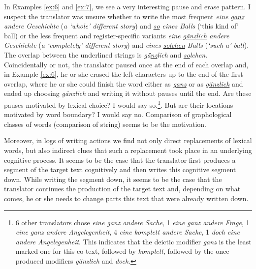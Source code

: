 In Examples \ref{ex:6} and \ref{ex:7}, we see a very interesting pause and erase pattern. I suspect the translator was unsure whether to write the most frequent \emph{eine \underline{ganz} andere Geschichte} (\emph{a `whole' different story}) and \emph{\underline{so} eines Balls} (`this kind of' ball) or the less frequent and register-specific variants \emph{eine \underline{gänzlich} andere Geschichte} (\emph{a `completely' different story}) and  \emph{eines \underline{solchen} Balls} (\emph{`such a' ball}). The overlap between the underlined strings is \emph{\underline{g}ä\underline{nz}lich} and \emph{\underline{so}lchen}. Coincidentally or not, the translator paused once at the end of each overlap and, in Example \ref{ex:6}, he or she erased the left characters up to the end of the first overlap, where he or she could finish the word either as \emph{g\underline{anz}} or as \emph{g\underline{änzlich}} and ended up choosing \emph{gänzlich} and writing it without pauses until the end. Are these pauses motivated by lexical choice? I would say so.\footnote{6 other translators chose \emph{eine ganz andere Sache}, 1 \emph{eine ganz andere Frage}, 1 \emph{eine ganz andere Angelegenheit}, 4 \emph{eine komplett andere Sache}, 1 \emph{doch eine andere Angelegenheit}. This indicates that the deictic modifier \emph{ganz} is the least marked one for this co-text, followed by \emph{komplett}, followed by the once produced modifiers \emph{gänzlich} and \emph{doch}.}.
But are their locations motivated by word boundary? I would say no. Comparison of graphological classes of words (comparison of string) seems to be the motivation.

Moreover, in logs of writing actions we find not only direct replacements of lexical words, but also indirect clues that such a replacement took place in an underlying cognitive process. It seems to be the case that the translator first produces a segment of the target text cognitively and then writes this cognitive segment down. While writing the segment down, it seems to be the case that the translator continues the production of the target text and, depending on what comes, he or she needs to change parts this text that were already written down.

